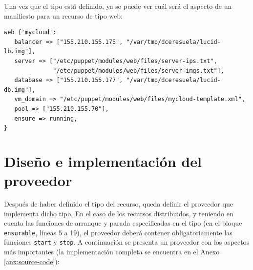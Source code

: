 Una vez que el tipo está definido, ya se puede ver cuál será el aspecto de un manifiesto para un recurso de tipo web:


\begin{lstlisting}
web {'mycloud':
   balancer => ["155.210.155.175", "/var/tmp/dceresuela/lucid-lb.img"],
   server => ["/etc/puppet/modules/web/files/server-ips.txt",
              "/etc/puppet/modules/web/files/server-imgs.txt"],
   database => ["155.210.155.177", "/var/tmp/dceresuela/lucid-db.img"],
   vm_domain => "/etc/puppet/modules/web/files/mycloud-template.xml",
   pool => ["155.210.155.70"],
   ensure => running,
}
\end{lstlisting}

\section{Diseño e implementación del proveedor}

Después de haber definido el tipo del recurso, queda definir el proveedor que implementa dicho tipo. En el caso de los recursos distribuidos, y teniendo en cuenta las funciones de arranque y parada especificadas en el tipo (en el bloque \texttt{ensurable}, líneas 5 a 19), el proveedor deberá contener obligatoriamente las funciones \texttt{start} y \texttt{stop}. A continuación se presenta un proveedor con los aspectos más importantes (la implementación completa se encuentra en el Anexo \ref{anx:source-code}):

